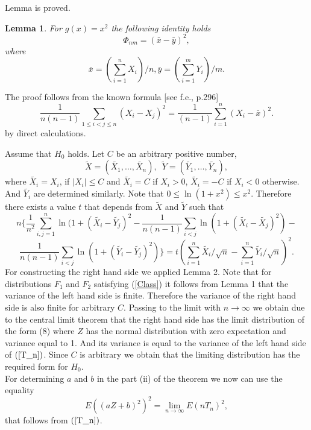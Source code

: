 \documentclass[final,11pt,3p]{elsarticle}
\newtheorem{lemma}{Lemma}
\begin{document}
Lemma is proved.

\begin{lemma} For $g(x)= x^2$ the following identity holds
$$
\Phi_{nm}= (\bar x - \bar y)^2,
$$
where
$$
\bar x = (\sum_{i=1}^n X_i)/n,
\bar y = (\sum_{i=1}^m Y_i)/m.
$$
\end{lemma}

The proof follows from the known formula [see f.e.\cite{Hoeffding}, p.296]
$$
\frac {1}{n(n-1)}\sum_{1\leq i<j\leq n
} (X_i-X_j)^2=\frac {1}{(n-1)} \sum_{i=1}^n (X_i - \bar x)^2.
$$
by  direct calculations.

Assume that $H_0$ holds. Let  $C$ be an arbitrary positive number,
$$
\tilde{X}=(\tilde{X_{1}},\ldots,\tilde{X_{n}}),\,\,\,
\tilde{Y}=(\tilde{Y_{1}},\ldots, \tilde{Y_{n}}),
$$
where $\tilde{X_{i}}=X_{i}$, if $
|X_{i}| \leq C$ and
 $\tilde{X_i}=C$ if $X_{i}>0$,
  $\tilde{X_i}=-C$ if $X_{i}<0$ otherwise. And $\tilde{Y_{i}}$ are determined similarly. Note that  $0 \leq \ln (1+x^2) \leq x^2$. Therefore there exists a value $t$ that depends from $\tilde{X}$ and $\tilde{Y}$ such that
\begin{equation}
n\{\frac{1}{n^2}\sum_{i,j=1}^n \ln(1 + (\tilde{X_{i}} - \tilde{Y_j})^2 -\frac{1}{n(n-1)}\sum_{i<j} \ln(1 + (\tilde{X_i} - \tilde{X_j})^2) -
\end{equation}
\begin{equation}\label{T_n}
 \frac{1}{n(n-1)}\sum_{i<j}  \ln(1 + (\tilde{Y_i} - \tilde{Y_j})^2)\}=
t
(\sum_{i=1}^n \tilde{X_{i}}/\sqrt{n}-\sum_{i=1}^n \tilde{Y_{i}}/\sqrt{n})^2.
\end{equation}
For constructing the right hand side we applied Lemma 2.
Note  that for distributions $F_1$ and $F_2$  satisfying (\ref{Class}) it follows from Lemma 1 that the variance of the left hand side is finite. Therefore the variance of the right hand side is also finite for arbitrary $C$.
Passing to the limit with $n\to \infty$ we obtain due to the central limit theorem that the right hand side has the limit distribution of the form (8) where  $Z$ has the normal distribution with zero expectation and variance equal to 1. And its variance  is equal to the variance of the left hand side  of $(\ref{T_n})$. Since $C$ is arbitrary we obtain that the limiting distribution has the required form for $H_0$. \\
 For determining $a$ and $b$ in the part (ii) of the theorem  we now can use the equality
 \begin{equation}\label{identity}
 E((aZ+b)^2)^2 =\lim_{n \to \infty}
 E(nT_n)^2,
 \end{equation}
 that follows from  $(\ref{T_n})$.
\end{document}
